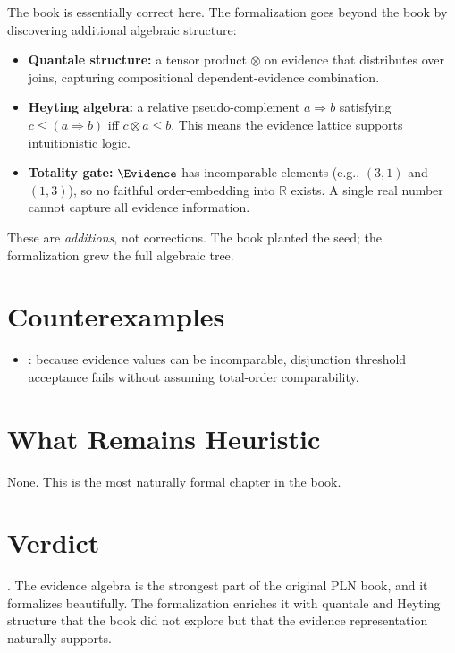 \documentclass[11pt,openany]{report}
\begin{document}
The book is essentially correct here.  The formalization goes beyond
the book by discovering additional algebraic structure:
\begin{itemize}
\item \textbf{Quantale structure:} a tensor product $\otimes$ on evidence
  that distributes over joins, capturing compositional dependent-evidence
  combination.
\item \textbf{Heyting algebra:} a relative pseudo-complement
  $a \Rightarrow b$ satisfying $c \le (a \Rightarrow b)$ iff $c \otimes a \le b$.
  This means the evidence lattice supports intuitionistic logic.
\item \textbf{Totality gate:} $\Evidence$ has incomparable elements
  (e.g., $(3,1)$ and $(1,3)$), so no faithful order-embedding into $\mathbb{R}$
  exists.  A single real number cannot capture all evidence information.
\end{itemize}

These are \emph{additions}, not corrections.  The book planted the seed;
the formalization grew the full algebraic tree.

\section{Counterexamples}

\begin{itemize}
\item {}: because evidence values can be
  incomparable, disjunction threshold acceptance fails without assuming
  total-order comparability.
\end{itemize}

\section{What Remains Heuristic}

None.  This is the most naturally formal chapter in the book.

\section{Verdict}

\verdictClean{}.  The evidence algebra is the strongest part of the
original PLN book, and it formalizes beautifully.  The formalization
enriches it with quantale and Heyting structure that the book did not
explore but that the evidence representation naturally supports.
\end{document}
